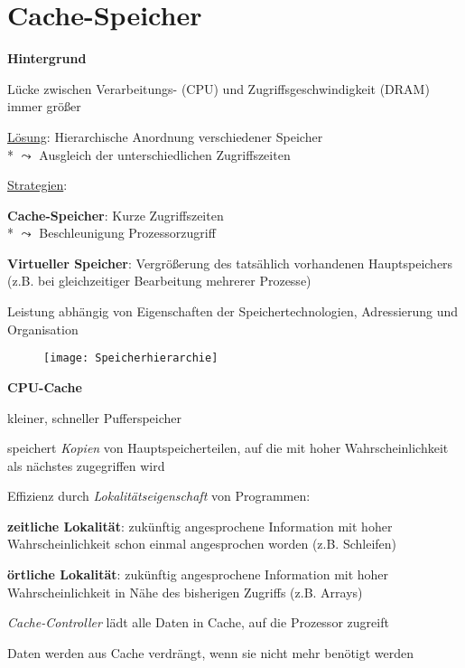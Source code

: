 \section{Cache-Speicher}

\textbf{Hintergrund}
\begin{items}
	\item Lücke zwischen Verarbeitungs- (CPU) und Zugriffsgeschwindigkeit (DRAM) immer größer
	\item \underline{Lösung}: Hierarchische Anordnung verschiedener Speicher \\*
		\( \leadsto \) Ausgleich der unterschiedlichen Zugriffszeiten
	\item \underline{Strategien}:
	\begin{enumeration}
		\item \textbf{Cache-Speicher}: Kurze Zugriffszeiten \\*
			\( \leadsto \) Beschleunigung Prozessorzugriff
		\item \textbf{Virtueller Speicher}: Vergrößerung des tatsählich vorhandenen Hauptspeichers (z.B. bei gleichzeitiger Bearbeitung mehrerer Prozesse)
	\end{enumeration}
	\item Leistung abhängig von Eigenschaften der Speichertechnologien, Adressierung und Organisation
\end{items}
\begin{figure}[H]\centering\label{Speicherhierarchie}\texttt{[image: Speicherhierarchie]}\end{figure}

\textbf{CPU-Cache}
\begin{items}
	\item kleiner, schneller Pufferspeicher
	\item speichert \emph{Kopien} von Hauptspeicherteilen, auf die mit hoher Wahrscheinlichkeit als nächstes zugegriffen wird
	\item Effizienz durch \emph{Lokalitätseigenschaft} von Programmen:
	\begin{enumeration}
		\item \textbf{zeitliche Lokalität}: zukünftig angesprochene Information mit hoher Wahrscheinlichkeit schon einmal angesprochen worden (z.B. Schleifen)
		\item \textbf{örtliche Lokalität}: zukünftig angesprochene Information mit hoher Wahrscheinlichkeit in Nähe des bisherigen Zugriffs (z.B. Arrays)
	\end{enumeration}
	\item \emph{Cache-Controller} lädt alle Daten in Cache, auf die Prozessor zugreift
	\item Daten werden aus Cache verdrängt, wenn sie nicht mehr benötigt werden
\end{items}

